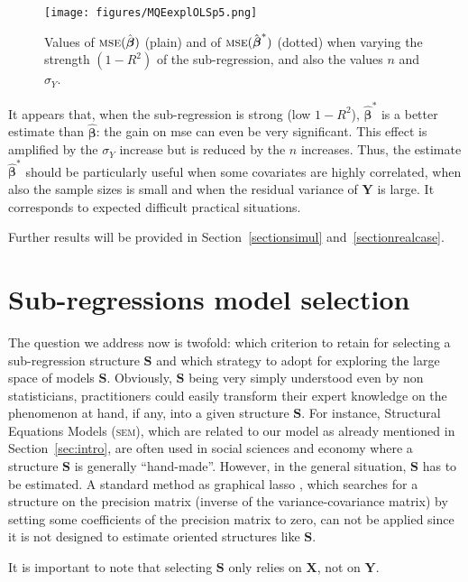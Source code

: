 \documentclass[11pt,a4paper]{article}
\begin{document}
\begin{figure}[h!]
	\texttt{[image: figures/MQEexplOLSp5.png]}\label{MQE1}
	\caption{Values of $\textsc{mse}(\hat{\boldsymbol{\beta}})$ (plain) and of $\textsc{mse}(\hat{\boldsymbol{\beta}}^*)$ (dotted) when varying the strength $(1-R^2)$ of the sub-regression, and also the values $n$ and $\sigma_Y$.}
\end{figure}
It appears that, when the sub-regression is strong (low $1-R^2$), $\hat{\boldsymbol{\beta}}^*$ is a better estimate than $\hat{\boldsymbol{\beta}}$: the gain on {\sc mse} can even be very significant. This effect is amplified by the $\sigma_Y$ increase but is reduced by the $n$ increases. Thus, the estimate $\hat{\boldsymbol{\beta}}^*$ should be particularly useful when some covariates are highly correlated, when also the sample sizes is small and when the residual variance of $\boldsymbol{Y}$ is large. It corresponds to expected difficult practical situations.

Further results will be provided in Section~\ref{sectionsimul} and~\ref{sectionrealcase}.


\section{Sub-regressions model selection}	\label{sec:estimateS}

The question we address now is twofold: which criterion to retain for selecting a sub-regression structure $\boldsymbol{S}$ and which strategy to adopt for exploring the large space of models $\boldsymbol{S}$. Obviously, $\boldsymbol{S}$ being very simply understood even by non statisticians, practitioners could easily transform their expert knowledge on the phenomenon at hand, if any, into a given structure $\boldsymbol{S}$. For instance, Structural Equations Models (\textsc{sem}), which are related to our model as already mentioned in Section~\ref{sec:intro}, are often used in social sciences and economy where a structure $\boldsymbol{S}$ is generally ``hand-made''. However, in the general situation, $\boldsymbol{S}$ has to be estimated.  A standard method as graphical {\sc lasso} \cite{friedman2008sparse}, which searches for a structure on the precision matrix (inverse of the variance-covariance matrix) by setting some coefficients of the precision matrix to zero, can not be applied since it is not designed to estimate oriented structures like $\boldsymbol{S}$.

It is important to note that selecting $\boldsymbol{S}$ only relies on $\boldsymbol{X}$, not on $\boldsymbol{Y}$. 
\end{document}

